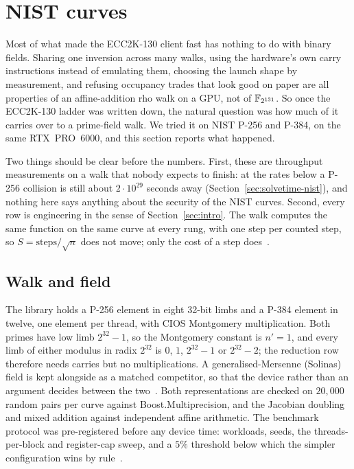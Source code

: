 \section{NIST curves}
\label{sec:nist}

Most of what made the ECC2K-130 client fast has nothing to do with
binary fields. Sharing one inversion across many walks, using the
hardware's own carry instructions instead of emulating them, choosing
the launch shape by measurement, and refusing occupancy trades that
look good on paper are all properties of an affine-addition rho walk
on a GPU, not of $\mathbb{F}_{2^{131}}$. So once the ECC2K-130 ladder was
written down, the natural question was how much of it carries over to
a prime-field walk. We tried it on NIST P-256 and P-384, on the same
RTX~PRO~6000, and this section reports what happened.

Two things should be clear before the numbers. First, these are
throughput measurements on a walk that nobody expects to finish: at
the rates below a P-256 collision is still about $2\cdot10^{29}$ seconds
away (Section~\ref{sec:solvetime-nist}), and nothing here says anything about the security of the NIST
curves. Second, every row is engineering in the sense of
Section~\ref{sec:intro}. The walk computes the same function on the
same curve at every rung, with one step per counted step, so
$S=\text{steps}/\sqrt n$ does not move; only the cost of a step
does~.

\subsection{Walk and field}
\label{sec:nist-walk}

The library holds a P-256 element in eight 32-bit limbs and a P-384
element in twelve, one element per thread, with CIOS Montgomery
multiplication. Both primes have low limb $2^{32}-1$, so the Montgomery
constant is $n'=1$, and every limb of either modulus in radix $2^{32}$
is $0$, $1$, $2^{32}-1$ or $2^{32}-2$; the reduction row therefore
needs carries but no multiplications. A generalised-Mersenne (Solinas)
field is kept alongside as a matched competitor, so that the device
rather than an argument decides between the two~.
Both representations are checked on $20{,}000$ random pairs per curve
against Boost.Multiprecision, and the Jacobian doubling and mixed
addition against independent affine arithmetic. The benchmark
protocol was pre-registered before any device time: workloads, seeds,
the threads-per-block and register-cap sweep, and a $5\%$ threshold
below which the simpler configuration wins by
rule~.

